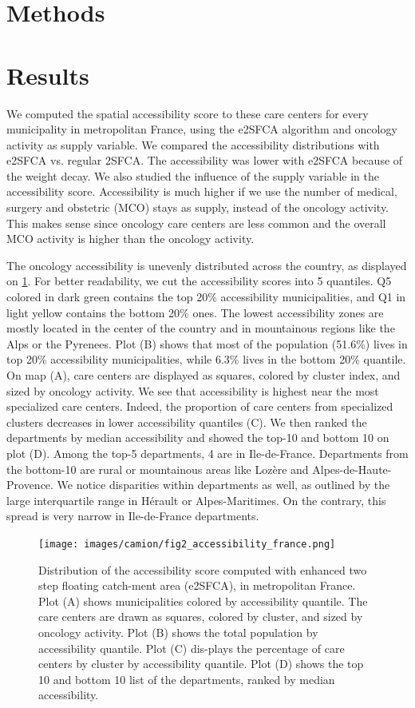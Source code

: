 \section{Methods}

\section{Results}

We computed the spatial accessibility score to these care centers for every municipality in metropolitan France, using the e2SFCA algorithm and oncology activity as supply variable. We compared the accessibility distributions with e2SFCA vs. regular 2SFCA. The accessibility was lower with e2SFCA because of the weight decay. We also studied the influence of the supply variable in the accessibility score. Accessibility is much higher if we use the number of medical, surgery and obstetric (MCO) stays as supply, instead of the oncology activity. This makes sense since oncology care centers are less common and the overall MCO activity is higher than the oncology activity.

The oncology accessibility is unevenly distributed across the country, as displayed on \cref{fig:accessibility-france}. For better readability, we cut the accessibility scores into 5 quantiles. Q5 colored in dark green contains the top 20\% accessibility municipalities, and Q1 in light yellow contains the bottom 20\% ones. The lowest accessibility zones are mostly located in the center of the country and in mountainous regions like the Alps or the Pyrenees. Plot (B) shows that most of the population (51.6\%) lives in top 20\% accessibility municipalities, while 6.3\% lives in the bottom 20\% quantile. On map (A), care centers are displayed as squares, colored by cluster index, and sized by oncology activity. We see that accessibility is highest near the most specialized care centers. Indeed, the proportion of care centers from specialized clusters decreases in lower accessibility quantiles (C). We then ranked the departments by median accessibility and showed the top-10 and bottom 10 on plot (D). Among the top-5 departments, 4 are in Ile-de-France. Departments from the bottom-10 are rural or mountainous areas like Lozère and Alpes-de-Haute-Provence.  We notice disparities within departments as well, as outlined by the large interquartile range in Hérault or Alpes-Maritimes. On the contrary, this spread is very narrow in Ile-de-France departments.

\begin{figure}[h]
    \texttt{[image: images/camion/fig2\_accessibility\_france.png]}
    \centering
    \caption{
        Distribution of the accessibility score computed with enhanced two step floating catch-ment area (e2SFCA), in metropolitan France. Plot (A) shows municipalities colored by accessibility quantile. The care centers are drawn as squares, colored by cluster, and sized by oncology activity. Plot (B) shows the total population by accessibility quantile. Plot (C) dis-plays the percentage of care centers by cluster by accessibility quantile. Plot (D) shows the top 10 and bottom 10 list of the departments, ranked by median accessibility.
    }
    \label{fig:accessibility-france}
\end{figure}

